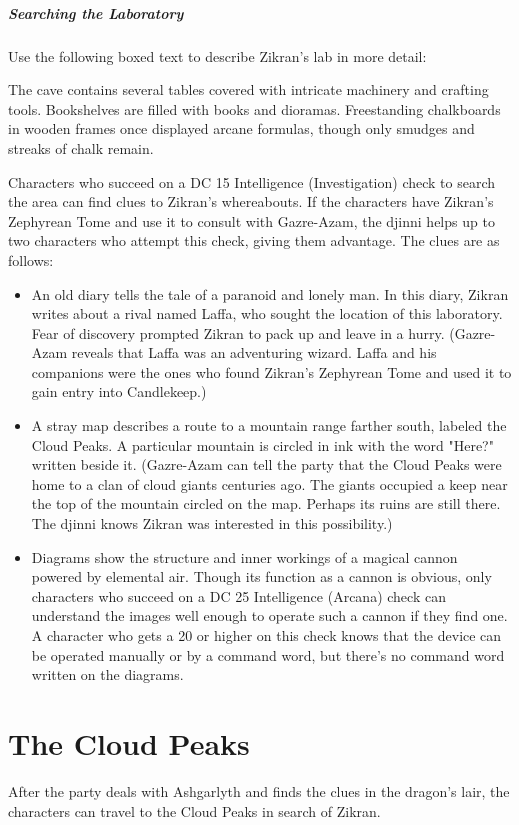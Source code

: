 \documentclass[10pt,a4paper,twoside,bg=print,twocolumn,openany,nodeprecatedcode]{dndbook}
\begin{document}
\subparagraph{Searching the Laboratory}
Use the following boxed text to describe Zikran's lab in more detail:

\begin{DndReadAloud}{}
The cave contains several tables covered with intricate machinery and crafting tools. Bookshelves are filled with books and dioramas. Freestanding chalkboards in wooden frames once displayed arcane formulas, though only smudges and streaks of chalk remain.

\end{DndReadAloud}

Characters who succeed on a DC 15 Intelligence (Investigation) check to search the area can find clues to Zikran's whereabouts. If the characters have Zikran's Zephyrean Tome and use it to consult with Gazre-Azam, the djinni helps up to two characters who attempt this check, giving them advantage. The clues are as follows:


\begin{itemize}
\item An old diary tells the tale of a paranoid and lonely man. In this diary, Zikran writes about a rival named Laffa, who sought the location of this laboratory. Fear of discovery prompted Zikran to pack up and leave in a hurry. (Gazre-Azam reveals that Laffa was an adventuring wizard. Laffa and his companions were the ones who found Zikran's Zephyrean Tome and used it to gain entry into Candlekeep.)
\item A stray map describes a route to a mountain range farther south, labeled the Cloud Peaks. A particular mountain is circled in ink with the word "Here?" written beside it. (Gazre-Azam can tell the party that the Cloud Peaks were home to a clan of cloud giants centuries ago. The giants occupied a keep near the top of the mountain circled on the map. Perhaps its ruins are still there. The djinni knows Zikran was interested in this possibility.)
\item Diagrams show the structure and inner workings of a magical cannon powered by elemental air. Though its function as a cannon is obvious, only characters who succeed on a DC 25 Intelligence (Arcana) check can understand the images well enough to operate such a cannon if they find one. A character who gets a 20 or higher on this check knows that the device can be operated manually or by a command word, but there's no command word written on the diagrams.
\end{itemize}

\section{The Cloud Peaks}
After the party deals with Ashgarlyth and finds the clues in the dragon's lair, the characters can travel to the Cloud Peaks in search of Zikran.
\end{document}
